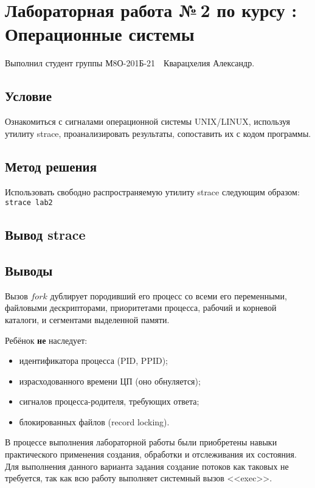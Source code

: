 \documentclass[12pt]{article}
\begin{document}
	
	\section*{\centering Лабораторная работа №\,2 по курсу :\\ Операционные системы}
	
	Выполнил студент группы М8О-201Б-21 \,\, Кварацхелия Александр.
	
	\subsection*{Условие}
	
	Ознакомиться с сигналами операционной системы UNIX/LINUX, используя утилиту strace, проанализировать результаты, сопоставить их с кодом программы.

	\subsection*{Метод решения}
		
	Использовать свободно распространяемую утилиту strace следующим образом: \\
	\lstinline[]|strace lab2|
	
	\subsection*{Вывод  strace}
	
	
	
	\subsection*{Выводы}
	
	Вызов $fork$ дублирует породивший его процесс со всеми его переменными, файловыми дескрипторами, приоритетами процесса, рабочий и корневой каталоги, и сегментами выделенной памяти.
	
	Ребёнок {\bf не} наследует:
	\begin{itemize}
		\item идентификатора процесса (PID, PPID);
		\item израсходованного времени ЦП (оно обнуляется);
		\item сигналов процесса-родителя, требующих ответа;
		\item блокированных файлов (record locking).
	\end{itemize}
	
	В процессе выполнения лабораторной работы были приобретены навыки практического применения создания, обработки и отслеживания их состояния. Для выполнения данного варианта задания создание потоков как таковых не требуется, так как всю работу выполняет системный вызов <<exec>>.
	
\end{document}
